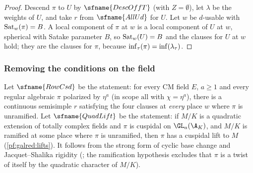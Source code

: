 \begin{proof}
Descend $\pi$ to $U$ by $\sfname{DescOffT}$ (with $Z=\emptyset$), let $\lambda$ be the weights of $U$, and take $r$ from
$\sfname{AllUd}$ for $U$. Let $w$ be $d$-usable with $\operatorname{Sat}_w(\pi)=B$. A local component of $\pi$ at $w$ is a local
component of $U$ at $w$, spherical with Satake parameter $B$, so $\operatorname{Sat}_w(U)=B$ and the clauses for $U$ at $w$ hold; they
are the clauses for $\pi$, because $\operatorname{inf}_\tau(\pi)=\operatorname{inf}(\lambda_\tau)$.
\end{proof}

\subsubsection{Removing the conditions on the field}

Let $\sfname{RowCsd}$ be the statement: for every CM field $E$, $a\ge1$ and every regular algebraic $\pi$ polarized by
$\eta^a$ (in scope $\mathrm{all}$ with $\chi=\eta^a$), there is a continuous semisimple $r$ satisfying the four clauses at
\emph{every} place $w$ where $\pi$ is unramified. Let $\sfname{QuadLift}$ be the statement: if $M/K$ is a quadratic extension of
totally complex fields and $\pi$ is cuspidal on $\GL_a(\A_K)$, and $M/K$ is ramified at some place where $\pi$ is unramified,
then $\pi$ has a cuspidal lift to $M$ (\cref{pf:galred:lifts}). It follows from the strong form of cyclic base change
\cite{ArthurClozel1989} and Jacquet--Shalika rigidity \cite{JacquetShalika1981}
(; the ramification hypothesis excludes that $\pi$ is a twist of itself by the
quadratic character of $M/K$).

